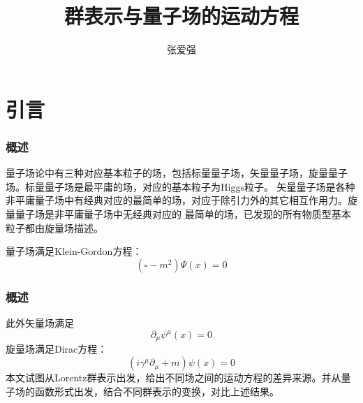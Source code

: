\documentclass[aspectratio=1610,12pt]{beamer}
\title{群表示与量子场的运动方程}
\author{张爱强}
\institute{2019311113}
\date{}
\begin{document}
\begin{frame}
    \titlepage
\end{frame}
\begin{frame}
    \tableofcontents
\end{frame}
\section{引言}
\begin{frame}
    \frametitle{概述}
    \begin{block}{}
        量子场论中有三种对应基本粒子的场，包括标量量子场，矢量量子场，旋量量子场。标量量子场是最平庸的场，对应的基本粒子为Higgs粒子。
        矢量量子场是各种非平庸量子场中有经典对应的最简单的场，对应于除引力外的其它相互作用力。旋量量子场是非平庸量子场中无经典对应的
        最简单的场，已发现的所有物质型基本粒子都由旋量场描述。

        量子场满足Klein-Gordon方程\cite{weinberg}：
        \begin{equation}
            (\square-m^2)\Psi(x)=0
        \end{equation}
    \end{block}
\end{frame}
\begin{frame}
    \frametitle{概述}
    \begin{block}{}
        此外矢量场满足
        \begin{equation}
            \partial_\mu\psi^\mu(x)=0
        \end{equation}
        旋量场满足Dirac方程：
        \begin{equation}
            (i\gamma^\mu\partial_\mu+m)\psi(x)=0
        \end{equation}
        本文试图从Lorentz群表示出发，给出不同场之间的运动方程的差异来源。并从量子场的函数形式出发，结合不同群表示的变换\cite{weinberg}，对比上述结果。
    \end{block}
\end{frame}
\end{document}
